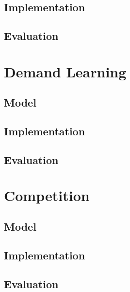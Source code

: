 \subsection{Implementation}
\subsection{Evaluation}

\section{Demand Learning}
\subsection{Model}
\subsection{Implementation}
\subsection{Evaluation}

\section{Competition}
\subsection{Model}
\subsection{Implementation}
\subsection{Evaluation}

